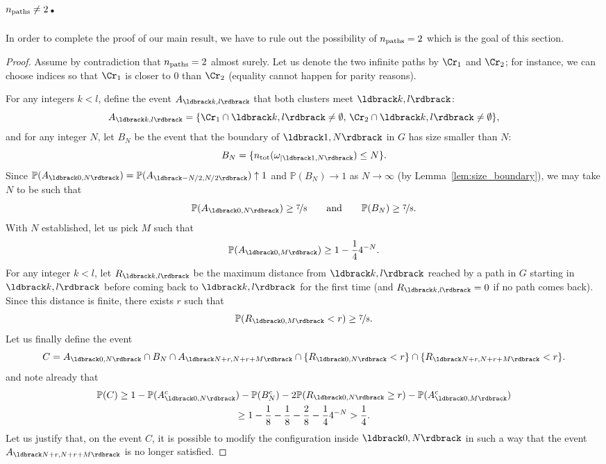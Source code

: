 \documentclass[12pt]{amsart}
\newcommand{\prob}{\mathbb{P}}
\newcommand{\npath}{n_{\rm paths}}
\theoremstyle{remark}
\newcommand{\Li}{\ldbrack} %
\newcommand{\Ri}{\rdbrack}
\begin{document}
\section{\texorpdfstring{$\npath \ne 2$.}{The number of paths is not 2.}}\label{sec:rewire}
In order to complete the proof of our main result, we have to rule out the possibility of $\npath =2$ which is the goal of this section.

\begin{proof}
Assume by contradiction that $\npath=2$ almost surely. Let us denote the two infinite paths by $\Cr_1$ and $\Cr_2$; for instance, we can choose indices so that $\Cr_1$ is closer to $0$ than $\Cr_2$ (equality cannot happen for parity reasons).

For any integers $k<l$, define the event $A_{\Li k,l\Ri}$ that both clusters meet $\Li k,l\Ri$:
\[A_{\Li k,l\Ri}=\{\Cr_1\cap\Li k,l\Ri\neq\emptyset,\, \Cr_2\cap\Li k,l\Ri\neq\emptyset\},\]
and for any integer $N$, let $B_N$ be the event that the boundary of $\Li1,N\Ri$ in $G$ has size smaller than $N$: 
\[B_N=\{\ntot(\omega_{|\Li1,N\Ri})\le N\}.\] 
Since $\prob(A_{\Li0,N\Ri})=\prob(A_{\Li-N/2,N/2\Ri})\uparrow 1$ and $\prob(B_N)\to1$ as $N\to\infty$ (by Lemma~\ref{lem:size_boundary}), we may take $N$ to be such that 
\[\prob(A_{\Li0,N\Ri})\ge \nicefrac 78
\qquad\text{and}\qquad \prob(B_N)\ge \nicefrac 78.\]
With $N$ established, let us pick $M$ such that
\[\prob(A_{\Li0,M\Ri})\ge 1-\frac14 4^{-N}.\]
For any integer $k<l$, let $R_{\Li k,l\Ri}$ be the maximum distance from $\Li k,l\Ri$ reached by a path in $G$ starting in $\Li k,l\Ri$ before coming back to $\Li k,l\Ri$ for the first time (and $R_{\Li k,l\Ri}=0$ if no path comes back). Since this distance is finite, there exists $r$ such that 
\[\prob(R_{\Li0,M\Ri}<r)\ge \nicefrac78.\] 
Let us finally define the event
\[C=A_{\Li0,N\Ri}\cap B_N\cap A_{\Li N+r,N+r+M\Ri}\cap\{R_{\Li 0,N\Ri}<r\}\cap \{R_{\Li N+r,N+r+M\Ri}<r\}.\]
and note already that
\begin{multline}\label{eqn:proba_c}
  \prob(C)\ge1-\prob(A_{\Li0,N\Ri}^c)-\prob(B_N^c)-2\prob(R_{\Li0,N\Ri}\ge r)-\prob(A_{\Li0,M\Ri}^c)\\
  \ge 1-\frac18-\frac18-\frac28-\frac144^{-N}>\frac14.
\end{multline}
Let us justify that, on the event $C$, it is possible to modify the configuration inside $\Li0,N\Ri$ in such a way that the event $A_{\Li N+r,N+r+M\Ri}$ is no longer satisfied. 


\end{proof}
\end{document}
